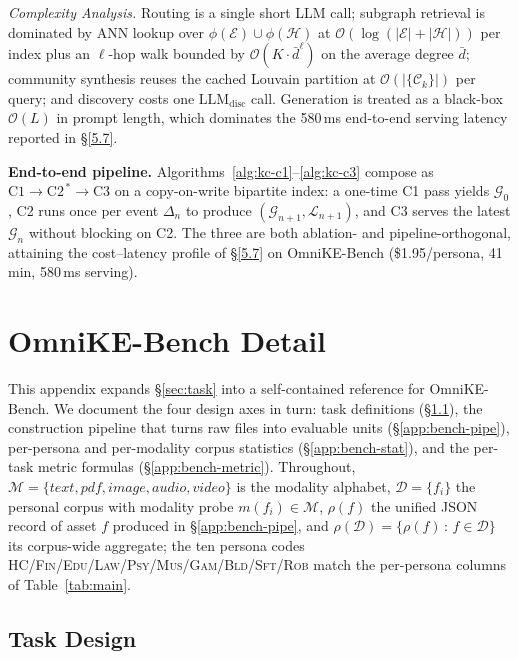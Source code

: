 \documentclass{article}
\begin{document}
\textit{Complexity Analysis.} Routing is a single short LLM call; subgraph retrieval is dominated by ANN lookup over $\phi(\mathcal{E})\!\cup\!\phi(\mathcal{H})$ at $\mathcal{O}(\log(|\mathcal{E}|\!+\!|\mathcal{H}|))$ per index plus an $\ell$-hop walk bounded by $\mathcal{O}(K\!\cdot\!\bar{d}^{\ell})$ on the average degree $\bar{d}$; community synthesis reuses the cached Louvain partition at $\mathcal{O}(|\{\mathcal{C}_k\}|)$ per query; and discovery costs one $\mathrm{LLM}_{\mathrm{disc}}$ call. Generation is treated as a black-box $\mathcal{O}(L)$ in prompt length, which dominates the 580\,ms end-to-end serving latency reported in \S\ref{5.7}.

\textbf{End-to-end pipeline.} Algorithms~\ref{alg:kc-c1}--\ref{alg:kc-c3} compose as $\mathrm{C1}\!\to\!\mathrm{C2}^{\,*}\!\to\!\mathrm{C3}$ on a copy-on-write bipartite index: a one-time C1 pass yields $\mathcal{G}_0$, C2 runs once per event $\Delta_n$ to produce $(\mathcal{G}_{n+1},\mathcal{L}_{n+1})$, and C3 serves the latest $\mathcal{G}_n$ without blocking on C2. The three are both ablation- and pipeline-orthogonal, attaining the cost--latency profile of \S\ref{5.7} on OmniKE-Bench (\$1.95/persona, 41\,min, 580\,ms serving).
\clearpage

\section{OmniKE-Bench Detail}\label{app:bench}

This appendix expands \S\ref{sec:task} into a self-contained reference for OmniKE-Bench. We document the four design axes in turn: task definitions (\S\ref{app:bench-task}), the construction pipeline that turns raw files into evaluable units (\S\ref{app:bench-pipe}), per-persona and per-modality corpus statistics (\S\ref{app:bench-stat}), and the per-task metric formulas (\S\ref{app:bench-metric}). Throughout, $\mathcal{M}\!=\!\{\textit{text},\textit{pdf},\textit{image},\textit{audio},\textit{video}\}$ is the modality alphabet, $\mathcal{D}\!=\!\{f_i\}$ the personal corpus with modality probe $m(f_i)\!\in\!\mathcal{M}$, $\rho(f)$ the unified JSON record of asset $f$ produced in \S\ref{app:bench-pipe}, and $\rho(\mathcal{D})\!=\!\{\rho(f)\,:\,f\!\in\!\mathcal{D}\}$ its corpus-wide aggregate; the ten persona codes \textsc{HC}/\textsc{Fin}/\textsc{Edu}/\textsc{Law}/\textsc{Psy}/\textsc{Mus}/\textsc{Gam}/\textsc{Bld}/\textsc{Sft}/\textsc{Rob} match the per-persona columns of Table~\ref{tab:main}.

\subsection{Task Design}\label{app:bench-task}
\end{document}
